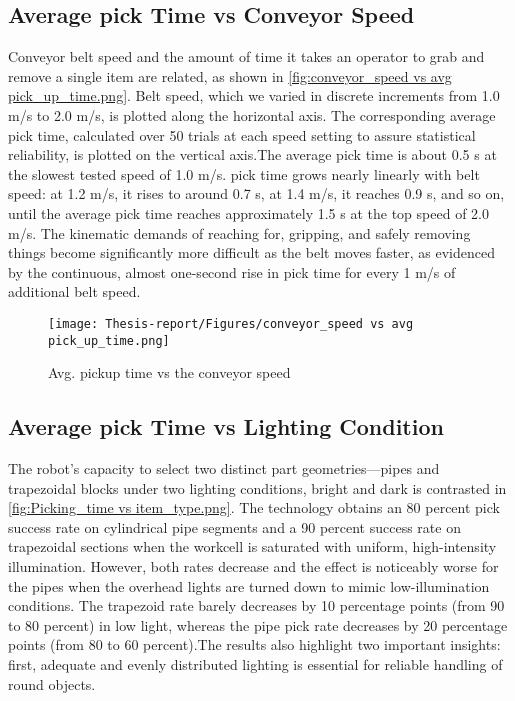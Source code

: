\documentclass[12pt]{article}
\begin{document}
\subsection{Average pick Time vs Conveyor Speed}
Conveyor belt speed and the amount of time it takes an operator to grab and remove a single item are related, as shown in \autoref{fig:conveyor_speed vs avg pick_up_time.png}.  Belt speed, which we varied in discrete increments from 1.0 m/s to 2.0 m/s, is plotted along the horizontal axis. The corresponding average pick time, calculated over 50 trials at each speed setting to assure statistical reliability, is plotted on the vertical axis.The average pick time is about 0.5 s at the slowest tested speed of 1.0 m/s.  pick time grows nearly linearly with belt speed: at 1.2 m/s, it rises to around 0.7 s, at 1.4 m/s, it reaches 0.9 s, and so on, until the average pick time reaches approximately 1.5 s at the top speed of 2.0 m/s.  The kinematic demands of reaching for, gripping, and safely removing things become significantly more difficult as the belt moves faster, as evidenced by the continuous, almost one-second rise in pick time for every 1 m/s of additional belt speed.

\begin{figure}[h]
    \centering
    \texttt{[image: Thesis-report/Figures/conveyor\_speed vs avg pick\_up\_time.png]}
    \caption{Avg. pickup time vs the conveyor speed \cite{ref22}}
    \label{fig:conveyor_speed vs avg pick_up_time.png}
\end{figure}


\subsection{Average pick Time vs Lighting Condition}
The robot's capacity to select two distinct part geometries—pipes and trapezoidal blocks under two lighting conditions, bright and dark is contrasted in \autoref{fig:Picking_time vs item_type.png}.  The technology obtains an 80 percent pick success rate on cylindrical pipe segments and a 90 percent success rate on trapezoidal sections when the workcell is saturated with uniform, high-intensity illumination.  However, both rates decrease and the effect is noticeably worse for the pipes when the overhead lights are turned down to mimic low-illumination conditions. The trapezoid rate barely decreases by 10 percentage points (from 90 to 80 percent) in low light, whereas the pipe pick rate decreases by 20 percentage points (from 80 to 60 percent).The results also highlight two important insights: first, adequate and evenly distributed lighting is essential for reliable handling of round objects.
\end{document}
